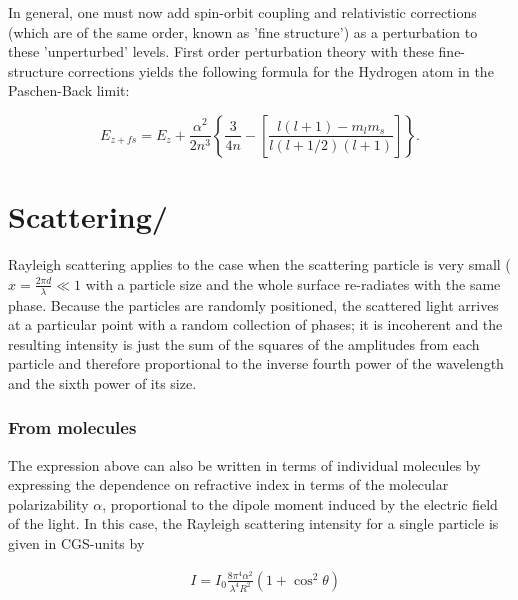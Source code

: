 \documentclass[main.tex]{subfiles}
\newcommand{\mblock}[1]{ {\allowbreak $#1$ }}
\begin{document}
In general, one must now add spin-orbit coupling and relativistic corrections (which are of the same order, known as 'fine structure') as a perturbation to these 'unperturbed' levels. First order perturbation theory with these fine-structure corrections yields the following formula for the Hydrogen atom in the Paschen-Back limit:

\begin{equation*}
E_{z+fs} = E_{z} + \frac{\alpha^2}{2 n^3} \left\{ \frac{3}{4n} - \left[ \frac{l(l+1) - m_l m_s}{l(l+1/2)(l+1) } \right]\right\}. 
\end{equation*}



\section{Scattering/}

Rayleigh scattering applies to the case when the scattering particle is very small (\mblock{x=\frac{2\pi d}{\lambda}\ll1} with a particle size and the whole surface re-radiates with the same phase. Because the particles are randomly positioned, the scattered light arrives at a particular point with a random collection of phases; it is incoherent and the resulting intensity is just the sum of the squares of the amplitudes from each particle and therefore proportional to the inverse fourth power of the wavelength and the sixth power of its size.
 
\subsubsection{From molecules}

The expression above can also be written in terms of individual molecules by expressing the dependence on refractive index in terms of the molecular polarizability $\alpha$, proportional to the dipole moment induced by the electric field of the light. In this case, the Rayleigh scattering intensity for a single particle is given in CGS-units by

\begin{align*}
&I=I_0\frac{8\pi^4\alpha^2}{\lambda^4R^2}(1+\cos^2{\theta})
\end{align*}
\end{document}
